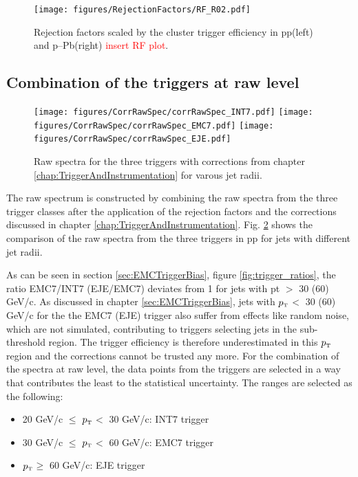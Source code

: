 \documentclass[ALICE]{ALICE_analysis_notes}
\newcommand{\pT}{$p_{\mbox{\tiny T}}$\xspace}
\newcommand{\pPb}{{\mbox{p--Pb}}\xspace}
\newcommand{\pp}{pp\xspace}
\begin{document}
\begin{figure}
    \centering
    \texttt{[image: figures/RejectionFactors/RF\_R02.pdf]}
    \caption{Rejection factors scaled by the cluster trigger efficiency in \pp (left) and \pPb (right) \textcolor{red}{insert RF plot}.}
    \label{fig:RejectionFactors}
\end{figure}

\subsection{Combination of the triggers at raw level}
\label{sec:triggerCombination}

\begin{figure}
    \centering
    \begin{multicols}{2}
            \texttt{[image: figures/CorrRawSpec/corrRawSpec\_INT7.pdf]}
            \texttt{[image: figures/CorrRawSpec/corrRawSpec\_EMC7.pdf]}
        \vfill\null 
        \columnbreak
            \texttt{[image: figures/CorrRawSpec/corrRawSpec\_EJE.pdf]}
        \vfill\null
    \end{multicols}
    \caption{Raw spectra for the three triggers with corrections from chapter \ref{chap:TriggerAndInstrumentation} for varous jet radii.}
    \label{fig:CorrRawSpec}
\end{figure}

The raw spectrum is constructed by combining the raw spectra from the three trigger classes after the application of the rejection factors and the corrections discussed in chapter \ref{chap:TriggerAndInstrumentation}. Fig. \ref{fig:CorrRawSpec} shows the comparison of the raw spectra from the three triggers in \pp for jets with different jet radii. 

As can be seen in section \ref{sec:EMCTriggerBias}, figure \ref{fig:trigger_ratios}, the ratio EMC7/INT7 (EJE/EMC7) deviates from 1 for jets with pt $>$ 30 (60) GeV/c. As discussed in chapter \ref{sec:EMCTriggerBias}, jets with \pT $<$ 30 (60) GeV/c for the the EMC7 (EJE) trigger also suffer from effects like random noise, which are not simulated, contributing to triggers selecting jets in the sub-threshold region. The trigger efficiency is therefore underestimated in this \pT region and the corrections cannot be trusted any more. For the combination of the spectra at raw level, the data points from the triggers are selected in a way that contributes the least to the statistical uncertainty. The ranges are selected as the following:

\begin{itemize}
    \item 20 GeV/c $\le$ \pT $<$ 30 GeV/c: INT7 trigger
    \item 30 GeV/c $\le$ \pT $<$ 60 GeV/c: EMC7 trigger
    \item \pT $\ge$ 60 GeV/c: EJE trigger
\end{itemize}
\end{document}
